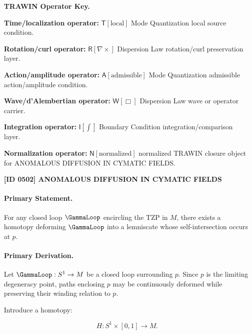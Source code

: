 \par\vspace{0.45\baselineskip}
\noindent\begin{minipage}[t]{\linewidth}
\begingroup
\small
\raggedright
\textbf{TRAWIN Operator Key.}\par
\noindent\textbf{Time/localization operator:} $\mathsf{T}\!\left[\mathrm{local}\right]$ Mode Quantization local source condition.\par
\noindent\textbf{Rotation/curl operator:} $\mathsf{R}\!\left[\nabla\times\right]$ Dispersion Law rotation/curl preservation layer.\par
\noindent\textbf{Action/amplitude operator:} $\mathsf{A}\!\left[\mathrm{admissible}\right]$ Mode Quantization admissible action/amplitude condition.\par
\noindent\textbf{Wave/d'Alembertian operator:} $\mathsf{W}\!\left[\Box\right]$ Dispersion Law wave or operator carrier.\par
\noindent\textbf{Integration operator:} $\mathsf{I}\!\left[\int\right]$ Boundary Condition integration/comparison layer.\par
\noindent\textbf{Normalization operator:} $\mathsf{N}\!\left[\mathrm{normalized}\right]$ normalized TRAWIN closure object for ANOMALOUS DIFFUSION IN CYMATIC FIELDS.\par
\endgroup
\end{minipage}

\clearpage
\noindent\textbf{[ID 0502] ANOMALOUS DIFFUSION IN CYMATIC FIELDS}\par
\vspace{0.35em}
\paragraph{Primary Statement.}
For any closed loop $\GammaLoop$ encircling the TZP in $M$, there exists a homotopy deforming $\GammaLoop$ into a lemniscate whose self-intersection occurs at $p$.

\paragraph{Primary Derivation.}
Let $\GammaLoop:S^1\to M$ be a closed loop surrounding $p$. Since $p$ is the limiting degeneracy point, paths enclosing $p$ may be continuously deformed while preserving their winding relation to $p$.

Introduce a homotopy:

\begin{equation}
H:S^1\times[0,1]\to M .
\end{equation}

